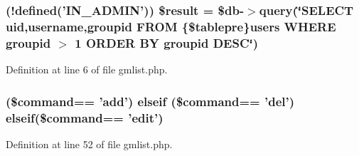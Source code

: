 \hypertarget{gmlist_8php_a3d355e0c1f1851fe7486bca611550a5f}{
\subsubsection[{\$result}]{ (!defined('{\bf I\+N\+\_\+\+A\+D\+M\+I\+N}')) \${\bf result} = \$db-\/$>$query(\char`\"{}S\+E\+L\+E\+C\+T uid,username,groupid F\+R\+O\+M \{\$tablepre\}users W\+H\+E\+R\+E groupid $>$ 1 O\+R\+D\+E\+R B\+Y groupid D\+E\+S\+C\char`\"{})}}\label{gmlist_8php_a3d355e0c1f1851fe7486bca611550a5f}


Definition at line 6 of file gmlist.\+php.

\hypertarget{gmlist_8php_a311ef487b52409c05de3e8386f968240}{
\subsubsection[{elseif}]{ (\$command== 'add') elseif (\$command== 'del') elseif(\$command== 'edit')}}\label{gmlist_8php_a311ef487b52409c05de3e8386f968240}


Definition at line 52 of file gmlist.\+php.

